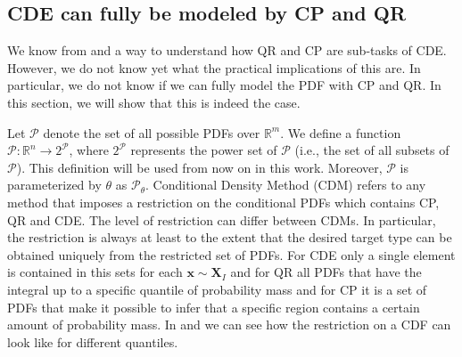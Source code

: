 \subsection{CDE can fully be modeled by CP and QR} \label{sec:cde_sub_cp_qr}

We know from  and  a way to understand how QR and CP are sub-tasks of CDE. However, we do not know yet what the practical implications of this are. In particular, we do not know if we can fully model the PDF with CP and QR. In this section, we will show that this is indeed the case.

Let $\mathcal{P}$ denote the set of all possible PDFs over $\mathbb{R}^m$. We define a function $\mathscr{P}: \mathbb{R}^n \rightarrow 2^{\mathcal{P}}$, where $2^{\mathcal{P}}$ represents the power set of $\mathcal{P}$ (i.e., the set of all subsets of $\mathcal{P}$). This definition will be used from now on in this work. Moreover, $\mathscr{P}$ is parameterized by $\theta$ as $\mathscr{P}_\theta$. Conditional Density Method (CDM) refers to any method that imposes a restriction on the conditional PDFs which contains CP, QR and CDE. The level of restriction can differ between CDMs. In particular, the restriction is always at least to the extent that the desired target type can be obtained uniquely from the restricted set of PDFs. For CDE only a single element is contained in this sets for each $\mathbf{x} \sim \mathbf{X}_I$ and for QR all PDFs that have the integral up to a specific quantile of probability mass and for CP it is a set of PDFs that make it possible to infer that a specific region contains a certain amount of probability mass. In  and  we can see how the restriction on a CDF can look like for different quantiles.

